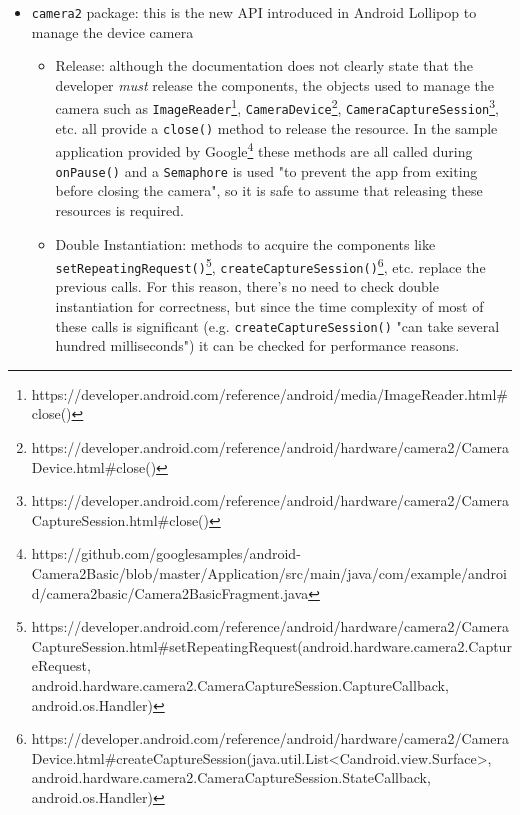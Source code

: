 \documentclass[11pt,a4paper,notitlepage]{article}
\begin{document}
\begin{itemize}
\begin{itemize}
			\begin{itemize}
				\item Release: releasing the camera is fundamental. Failing to do so means that all the applications on the device will be unable to use it\footnote{https://developer.android.com/reference/android/hardware/Camera.html\#release()}.
				\item Best Practices: the best practice is to acquire the camera during \texttt{onResume()} and release it during \texttt{onPause()}\footnote{https://developer.android.com/reference/android/hardware/Camera.html}.
				\item Double Instantiation: if the developer tries to acquire the camera twice, the system will throw a runtime exception\footnote{https://developer.android.com/reference/android/hardware/Camera.html\#open(int)}.
			\end{itemize}
			\item \texttt{camera2} package: this is the new API introduced in Android Lollipop to manage the device camera
			\begin{itemize}
				\item Release: although the documentation does not clearly state that the developer \textit{must} release the components, the objects used to manage the camera such as \texttt{ImageReader}\footnote{https://developer.android.com/reference/android/media/ImageReader.html\#close()}, \texttt{CameraDevice}\footnote{https://developer.android.com/reference/android/hardware/camera2/CameraDevice.html\#close()}, \texttt{CameraCaptureSession}\footnote{https://developer.android.com/reference/android/hardware/camera2/CameraCaptureSession.html\#close()}, etc. all provide a \texttt{close()} method to release the resource. In the sample application provided by Google\footnote{https://github.com/googlesamples/android-Camera2Basic/blob/master/Application/src/main/java/com/example/android/camera2basic/Camera2BasicFragment.java} these methods are all called during \texttt{onPause()} and a \texttt{Semaphore} is used "to prevent the app from exiting before closing the camera", so it is safe to assume that releasing these resources is required.
				\item Double Instantiation: methods to acquire the components like \texttt{setRepeatingRequest()}\footnote{https://developer.android.com/reference/android/hardware/camera2/CameraCaptureSession.html\#setRepeatingRequest(android.hardware.camera2.CaptureRequest, android.hardware.camera2.CameraCaptureSession.CaptureCallback, android.os.Handler)}, \texttt{createCaptureSession()}\footnote{https://developer.android.com/reference/android/hardware/camera2/CameraDevice.html\#createCaptureSession(java.util.List<Candroid.view.Surface>, android.hardware.camera2.CameraCaptureSession.StateCallback, android.os.Handler)}, etc. replace the previous calls. For this reason, there's no need to check double instantiation for correctness, but since the time complexity of most of these calls is significant (e.g. \texttt{createCaptureSession()} "can take several hundred milliseconds") it can be checked for performance reasons.

\end{itemize}
\end{itemize}
\end{itemize}
\end{document}
